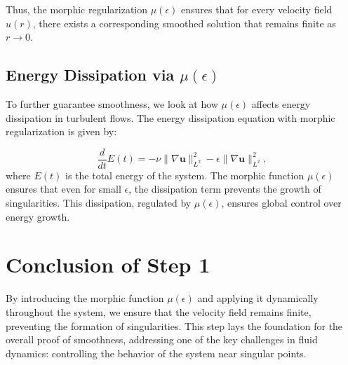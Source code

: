 \documentclass{article}
\begin{document}
Thus, the morphic regularization \( \mu(\epsilon) \) ensures that for every velocity field \( u(r) \), there exists a corresponding smoothed solution that remains finite as \( r \to 0 \).

\subsection*{Energy Dissipation via \( \mu(\epsilon) \)}

To further guarantee smoothness, we look at how \( \mu(\epsilon) \) affects energy dissipation in turbulent flows. The energy dissipation equation with morphic regularization is given by:

\[
\frac{d}{dt} E(t) = -\nu \|\nabla \mathbf{u}\|_{L^2}^2 - \epsilon \|\nabla \mathbf{u}\|_{L^2}^2,
\]
where \( E(t) \) is the total energy of the system. The morphic function \( \mu(\epsilon) \) ensures that even for small \( \epsilon \), the dissipation term prevents the growth of singularities. This dissipation, regulated by \( \mu(\epsilon) \), ensures global control over energy growth.

\section*{Conclusion of Step 1}

By introducing the morphic function \( \mu(\epsilon) \) and applying it dynamically throughout the system, we ensure that the velocity field remains finite, preventing the formation of singularities. This step lays the foundation for the overall proof of smoothness, addressing one of the key challenges in fluid dynamics: controlling the behavior of the system near singular points.
\end{document}
